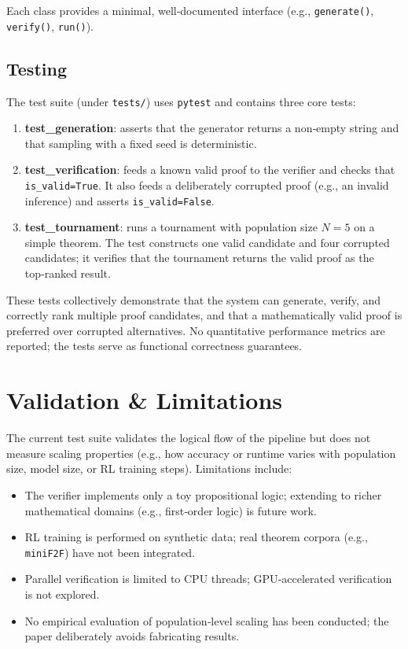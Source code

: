 \documentclass[11pt,a4paper]{article}
\begin{document}
Each class provides a minimal, well‑documented interface (e.g., \texttt{generate()}, \texttt{verify()}, \texttt{run()}).

\subsection{Testing}
The test suite (under \texttt{tests/}) uses \texttt{pytest} and contains three core tests:

\begin{enumerate}
    \item \textbf{test\_generation}: asserts that the generator returns a non‑empty string and that sampling with a fixed seed is deterministic.
    \item \textbf{test\_verification}: feeds a known valid proof to the verifier and checks that \texttt{is\_valid=True}.  It also feeds a deliberately corrupted proof (e.g., an invalid inference) and asserts \texttt{is\_valid=False}.
    \item \textbf{test\_tournament}: runs a tournament with population size $N=5$ on a simple theorem.  The test constructs one valid candidate and four corrupted candidates; it verifies that the tournament returns the valid proof as the top‑ranked result.
\end{enumerate}

These tests collectively demonstrate that the system can generate, verify, and correctly rank multiple proof candidates, and that a mathematically valid proof is preferred over corrupted alternatives.  No quantitative performance metrics are reported; the tests serve as functional correctness guarantees.

\section{Validation \& Limitations}
The current test suite validates the logical flow of the pipeline but does not measure scaling properties (e.g., how accuracy or runtime varies with population size, model size, or RL training steps).  Limitations include:

\begin{itemize}
    \item The verifier implements only a toy propositional logic; extending to richer mathematical domains (e.g., first‑order logic) is future work.
    \item RL training is performed on synthetic data; real theorem corpora (e.g., \texttt{miniF2F}) have not been integrated.
    \item Parallel verification is limited to CPU threads; GPU‑accelerated verification is not explored.
    \item No empirical evaluation of population‑level scaling has been conducted; the paper deliberately avoids fabricating results.
\end{itemize}
\end{document}
